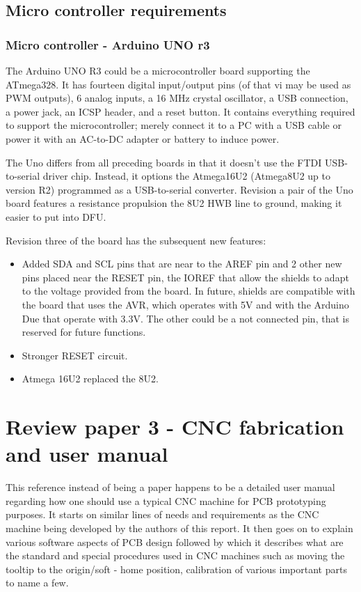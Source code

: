 \subsection{Micro controller requirements}

\subsubsection*{Micro controller - Arduino UNO r3}
The Arduino UNO R3 could be a microcontroller board supporting the ATmega328. It has fourteen digital input/output pins (of that vi may be used as PWM outputs), 6 analog inputs, a 16 MHz crystal oscillator, a USB connection, a power jack, an ICSP header, and a reset button. It contains everything required to support the microcontroller; merely connect it to a PC with a USB cable or power it with an AC-to-DC adapter or battery to induce power. \par

The Uno differs from all preceding boards in that it doesn't use the FTDI USB-to-serial driver chip. Instead, it options the Atmega16U2 (Atmega8U2 up to version R2) programmed as a USB-to-serial converter.
Revision a pair of the Uno board features a resistance propulsion the 8U2 HWB line to ground, making it easier to put into DFU.

Revision three of the board has the subsequent new features:

\begin{itemize}
 \item Added SDA and SCL pins that are near to the AREF pin and 2 other new pins placed near the RESET pin, the IOREF that allow the shields to adapt to the voltage provided from the board. In future, shields are compatible with the board that uses the AVR, which operates with 5V and with the Arduino Due that operate with 3.3V. The other could be a not connected pin, that is reserved for future functions.
 \item Stronger RESET circuit.
 \item Atmega 16U2 replaced the 8U2.
\end{itemize}


\section{Review paper 3 - CNC fabrication and user manual} \label{Sec:3}

This reference \cite{iiit_pap} instead of being a paper happens to be a detailed user manual regarding how one should use a typical CNC machine for PCB prototyping purposes. It starts on similar lines of needs and requirements as the CNC machine being developed by the authors of this report. It then goes on to explain various software aspects of PCB design followed by which it describes what are the standard and special procedures used in CNC machines such as moving the tooltip to the origin/soft - home position, calibration of various important parts to name a few. \par

